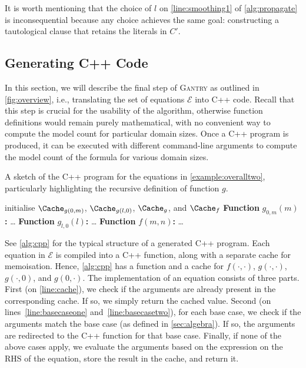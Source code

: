 \documentclass[a4paper,UKenglish,cleveref, autoref, thm-restate]{lipics-v2021}
\newcommand{\Cranetwo}{\textsc{Gantry}}
\begin{document}
It is worth mentioning that the choice of $l$ on \autoref{line:smoothing1} of
\cref{alg:propagate} is inconsequential because any choice achieves the same
goal: constructing a tautological clause that retains the literals in $C'$.

\subsection{Generating C++ Code}\label{sec:cpp}

In this section, we will describe the final step of \Cranetwo{} as outlined in
\cref{fig:overview}, i.e., translating the set of equations $\mathcal{E}$ into
C++ code. Recall that this step is crucial for the usability of the algorithm,
otherwise function definitions would remain purely mathematical, with no
convenient way to compute the model count for particular domain sizes. Once a
C++ program is produced, it can be executed with different command-line
arguments to compute the model count of the formula for various domain sizes.

\begin{algorithm}[t]
  \caption{A sketch of the C++ program for the equations in \cref{example:overalltwo}, particularly highlighting the recursive definition of function $g$.}\label{alg:cpp}
  initialise $\Cache_{g(0, m)}$, $\Cache_{g(l, 0)}$, $\Cache_{g}$, and $\Cache_{f}$\;
  \DontPrintSemicolon
  \textbf{Function} $g_{0,m}(m)$\textbf{:} \dots\;
  \textbf{Function} $g_{l,0}(l)$\textbf{:} \dots\;
  \PrintSemicolon
  \DontPrintSemicolon
  \textbf{Function} $f(m, n)$\textbf{:} \dots\;
  \PrintSemicolon
\end{algorithm}

See \cref{alg:cpp} for the typical structure of a generated C++ program. Each
equation in $\mathcal{E}$ is compiled into a C++ function, along with a separate
cache for memoisation. Hence, \cref{alg:cpp} has a function and a cache for
$f(\cdot, \cdot)$, $g(\cdot, \cdot)$, $g(\cdot, 0)$, and $g(0, \cdot)$. The
implementation of an equation consists of three parts. First (on
\autoref{line:cache}), we check if the arguments are already present in the
corresponding cache. If so, we simply return the cached value. Second (on
lines~\ref{line:basecaseone} and~\ref{line:basecasetwo}), for each base case, we
check if the arguments match the base case (as defined in \cref{sec:algebra}).
If so, the arguments are redirected to the C++ function for that base case.
Finally, if none of the above cases apply, we evaluate the arguments based on
the expression on the RHS of the equation, store the result in the cache, and
return it.
\end{document}
